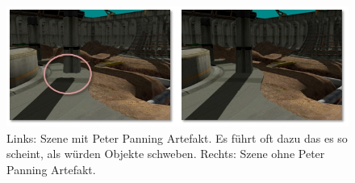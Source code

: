 \begin{figure}[H]
	\begin{center}
    \includegraphics[width=1\textwidth]{res/img/peter-panning1/image.jpg}
    \caption{Links\hspace{6pt}: Szene mit Peter Panning Artefakt. Es führt oft dazu das es so scheint, als würden Objekte schweben.
        \newline Rechts: Szene ohne Peter Panning Artefakt.}
	  \label{fig:peter-panning}
	\end{center}
\end{figure}


